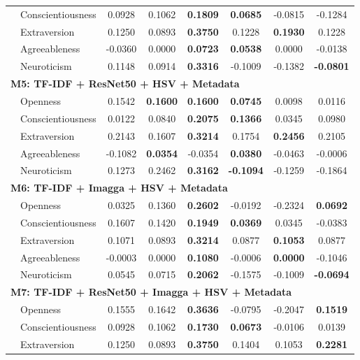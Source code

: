 \begin{longtable}{llcccccc}
& Conscientiousness & 0.0928 & 0.1062 & \textbf{0.1809} & \textbf{0.0685} & -0.0815 & -0.1284 \\
& Extraversion & 0.1250 & 0.0893 & \textbf{0.3750} & 0.1228 & \textbf{0.1930} & 0.1228 \\
& Agreeableness & -0.0360 & 0.0000 & \textbf{0.0723} & \textbf{0.0538} & 0.0000 & -0.0138 \\
& Neuroticism & 0.1148 & 0.0914 & \textbf{0.3316} & -0.1009 & -0.1382 & \textbf{-0.0801} \\
\hline
\multicolumn{8}{l}{\textbf{M5: TF-IDF + ResNet50 + HSV + Metadata}} \\
& Openness & 0.1542 & \textbf{0.1600} & \textbf{0.1600} & \textbf{0.0745} & 0.0098 & 0.0116 \\
& Conscientiousness & 0.0122 & 0.0840 & \textbf{0.2075} & \textbf{0.1366} & 0.0345 & 0.0980 \\
& Extraversion & 0.2143 & 0.1607 & \textbf{0.3214} & 0.1754 & \textbf{0.2456} & 0.2105 \\
& Agreeableness & -0.1082 & \textbf{0.0354} & -0.0354 & \textbf{0.0380} & -0.0463 & -0.0006 \\
& Neuroticism & 0.1273 & 0.2462 & \textbf{0.3162} & \textbf{-0.1094} & -0.1259 & -0.1864 \\
\hline
\multicolumn{8}{l}{\textbf{M6: TF-IDF + Imagga + HSV + Metadata}} \\
& Openness & 0.0325 & 0.1360 & \textbf{0.2602} & -0.0192 & -0.2324 & \textbf{0.0692} \\
& Conscientiousness & 0.1607 & 0.1420 & \textbf{0.1949} & \textbf{0.0369} & 0.0345 & -0.0383 \\
& Extraversion & 0.1071 & 0.0893 & \textbf{0.3214} & 0.0877 & \textbf{0.1053} & 0.0877 \\
& Agreeableness & -0.0003 & 0.0000 & \textbf{0.1080} & -0.0006 & \textbf{0.0000} & -0.1046 \\
& Neuroticism & 0.0545 & 0.0715 & \textbf{0.2062} & -0.1575 & -0.1009 & \textbf{-0.0694} \\
\hline
\multicolumn{8}{l}{\textbf{M7: TF-IDF + ResNet50 + Imagga + HSV + Metadata}} \\
& Openness & 0.1555 & 0.1642 & \textbf{0.3636} & -0.0795 & -0.2047 & \textbf{0.1519} \\
& Conscientiousness & 0.0928 & 0.1062 & \textbf{0.1730} & \textbf{0.0673} & -0.0106 & 0.0139 \\
& Extraversion & 0.1250 & 0.0893 & \textbf{0.3750} & 0.1404 & 0.1053 & \textbf{0.2281} \\

\end{longtable}

